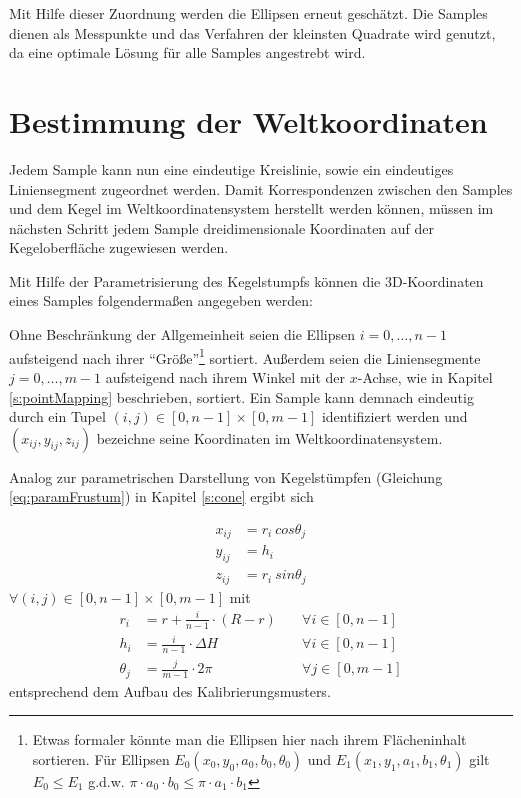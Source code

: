Mit Hilfe dieser Zuordnung werden die Ellipsen erneut geschätzt. 
Die Samples dienen als Messpunkte und das Verfahren der kleinsten Quadrate wird genutzt, da eine optimale Lösung für alle Samples angestrebt wird.

\section{Bestimmung der Weltkoordinaten}
Jedem Sample kann nun eine eindeutige Kreislinie, sowie ein eindeutiges Liniensegment zugeordnet werden. Damit Korrespondenzen zwischen den Samples und dem Kegel im Weltkoordinatensystem herstellt werden können, müssen im nächsten Schritt jedem Sample dreidimensionale Koordinaten auf der Kegeloberfläche zugewiesen werden.

Mit Hilfe der Parametrisierung des Kegelstumpfs können die 3D-Koordinaten eines Samples folgendermaßen angegeben werden:

Ohne Beschränkung der Allgemeinheit seien die Ellipsen $i = 0,\dotsc,n - 1$ aufsteigend nach ihrer "`Größe"'\footnote{Etwas formaler könnte man die Ellipsen hier nach ihrem Flächeninhalt sortieren. Für Ellipsen $E_0(x_0,y_0,a_0, b_0, \theta_0)$ und $E_1(x_1,y_1,a_1, b_1,\theta_1)$ gilt $E_0 \leq E_1$ g.d.w. $\pi\cdot a_0 \cdot b_0 \leq \pi \cdot a_1 \cdot b_1$} sortiert.
Außerdem seien die Liniensegmente $j = 0,\dotsc,m - 1$ aufsteigend nach ihrem Winkel mit der $x$-Achse, wie in Kapitel \ref{s:pointMapping} beschrieben, sortiert.
Ein Sample kann demnach eindeutig durch ein Tupel $(i,j) \in [0,n-1]\times [0,m-1]$ identifiziert werden und $(x_{ij},y_{ij},z_{ij})$ bezeichne seine Koordinaten im Weltkoordinatensystem.

Analog zur parametrischen Darstellung von Kegelstümpfen (Gleichung \ref{eq:paramFrustum}) in Kapitel \ref{s:cone} ergibt sich

\[
\begin{aligned}
x_{ij} &= r_i~cos \theta_j \\
y_{ij} &= h_i\\
z_{ij} &= r_i~sin \theta_j
\end{aligned}
\]
$\forall (i,j) \in [0,n-1]\times [0,m-1]$ mit
\[
\begin{aligned}
r_i &= r + \frac{i}{n - 1}\cdot(R - r) \quad&\forall i\in[0,n-1]\\
h_i &= \frac{i}{n - 1}\cdot\Delta H &\forall i\in[0,n-1]\\
\theta_j &= \frac{j}{m-1} \cdot  2\pi  &\forall j\in[0,m-1]
\end{aligned}
\] %
entsprechend dem Aufbau des Kalibrierungsmusters.



